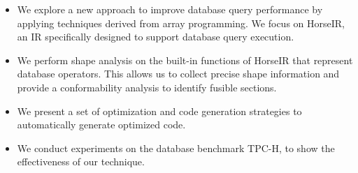 \begin{itemize}
\item We explore a new approach to improve database query performance by
      applying techniques derived from array programming. We focus on HorseIR, an IR specifically designed to support database query execution.
\item We perform shape analysis on the built-in functions of HorseIR that represent database operators. This allows us to collect precise shape information and provide a conformability analysis to identify fusible sections. 
\item We present a set of optimization and code generation strategies to automatically
      generate optimized code.
\item We conduct experiments on the database benchmark TPC-H, to show the effectiveness of our technique.
\end{itemize}

